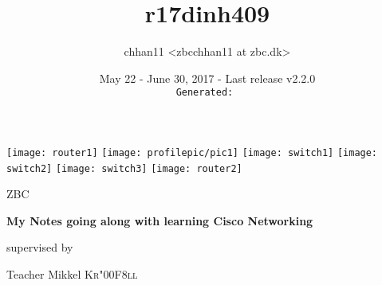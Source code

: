 
\title{r17dinh409}
\def\thesubject{My Notes going along with learning Cisco Networking}
\def\theinstitution{ZBC}

\author{chhan11 <zbcchhan11 at zbc.dk>}
\def\thesupervisor{Teacher Mikkel \textsc{Kr\char"00F8ll}}

\def\theversion{v2.2.0}
\date{May 22 - June 30, 2017 - Last release \theversion\\%
    {\tiny\texttt{\color{GreenYellow}Generated: \utccurrenttime}}}



\begin{titlepage}
    \centering
    \texttt{[image: router1]}
    \texttt{[image: profilepic/pic1]}
    \texttt{[image: switch1]}
    \texttt{[image: switch2]}
    \texttt{[image: switch3]}
    \texttt{[image: router2]}\par\vspace{1cm}
    {\scshape\LARGE \theinstitution\par}
    \vspace{1cm}
    {\scshape\Large \thetitle\par}
    \vspace{1.5cm}
    {\huge\bfseries \thesubject\par}
    \vspace{2cm}
    {\Large\itshape \theauthor\par}
    \vfill
    supervised by\par
    \thesupervisor
    
    \vfill
    
    {\large \thedate\par}
\end{titlepage}
